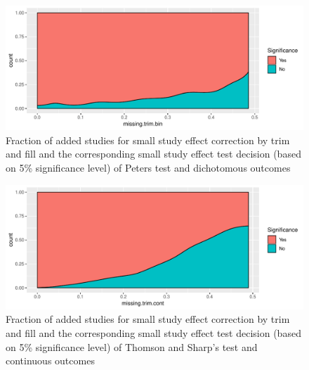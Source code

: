 \documentclass[11pt,a4paper,twoside]{book}\usepackage[]{graphicx}\usepackage[]{color}
\newenvironment{knitrout}{}{} %
\begin{document}
\begin{figure}
\begin{knitrout}
\color{fgcolor}

{\centering \includegraphics[width=\textwidth-3cm]{figure/ch02_figunnamed-chunk-28-1} 

}



\end{knitrout}
\caption{Fraction of added studies for small study effect correction by trim and fill and the corresponding small study effect test decision (based on 5\% significance level) of Peters test and dichotomous outcomes}
\label{trimfill.pvalues.bin}
\end{figure}

\begin{figure}
\begin{knitrout}
\color{fgcolor}

{\centering \includegraphics[width=\textwidth-3cm]{figure/ch02_figunnamed-chunk-29-1} 

}



\end{knitrout}
\caption{Fraction of added studies for small study effect correction by trim and fill and the corresponding small study effect test decision (based on 5\% significance level) of Thomson and Sharp's test and continuous outcomes}
\label{trimfill.pvalues.cont}
\end{figure}
\end{document}
